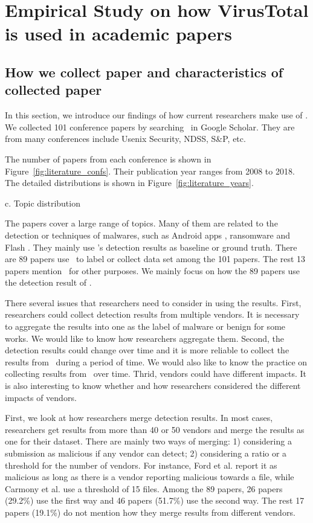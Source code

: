 \section{Empirical Study on how VirusTotal is used in academic papers}

\subsection{How we collect paper and characteristics of collected paper}

In this section, we introduce our findings of how current researchers make use of \vt. 
We collected 101 conference papers by searching \vt\ in Google Scholar. 
They are from many conferences include Usenix Security, NDSS, S\&P, etc. 

%

The number of papers from each conference is shown in Figure~\ref{fig:literature_confs}. 
Their publication year ranges from 2008 to 2018. The detailed distributions is shown in Figure~\ref{fig:literature_years}.

c. Topic distribution 

The papers cover a large range of topics. 
Many of them are related to the detection or techniques of malwares, such as Android apps \cite{arp2014drebin,huangvt2016bigdata}, ransomware \cite{kharraz2016unveil} and Flash \cite{ford2009analyzing}. 
They mainly use \vt's detection results as baseline or ground truth. 
There are 89 papers use \vt\ to label or collect data set among the 101 papers. 
The rest 13 papers mention \vt\ for other purposes. 
We mainly focus on how the 89 papers use the detection result of \vt.

There several issues that researchers need to consider in using the results. 
First, researchers could collect detection results from multiple vendors. 
It is necessary to aggregate the results into one as the label of malware or benign for some works. 
We would like to know how researchers aggregate them. 
Second, the detection results could change over time and it is more reliable to collect the results from \vt\ during a period of time. 
We would also like to know the practice on collecting results from \vt\ over time. 
Thrid, vendors could have different impacts. 
It is also interesting to know whether and how researchers considered the different impacts of vendors.

First, we look at how researchers merge detection results. 
In most cases, researchers get results from more than 40 or 50 vendors and merge the results as one for their dataset. 
There are mainly two ways of merging: 1) considering a submission as malicious if any vendor can detect; 2) considering a ratio or a threshold for the number of vendors. 
For instance, Ford et al. \cite{ford2009analyzing} report it as malicious as long as there is a vendor reporting malicious
towards a file, while Carmony et al. use a threshold of 15 files. 
Among the 89 papers, 26 papers (29.2\%) use the first way and 46 papers  (51.7\%) use the second way. 
The rest 17 papers (19.1\%) do not mention how they merge results from different vendors.

